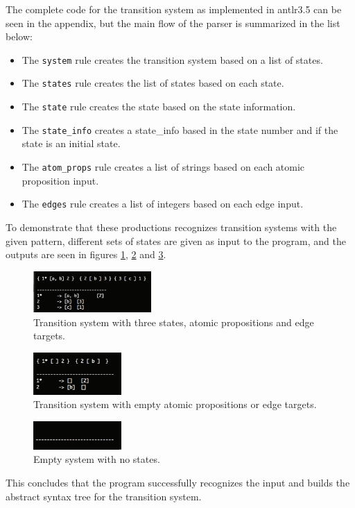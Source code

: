 The complete code for the transition system as implemented in antlr3.5 can be seen in the appendix, but the main flow of the parser is summarized in the list below:

\begin{itemize}
    \item The \texttt{system} rule creates the transition system based on a list of states.
    \item The \texttt{states} rule creates the list of states based on each state. 
    \item The \texttt{state} rule creates the state based on the state information. 
    \item The \texttt{state\_info} creates a state\_info based in the state number and if the state is an initial state. 
    \item The \texttt{atom\_props} rule creates a list of strings based on each atomic proposition input.
    \item The \texttt{edges} rule creates a list of integers based on each edge input.
\end{itemize}

To demonstrate that these productions recognizes transition systems with the given pattern, different sets of states are given as input to the program, and the outputs are seen in figures \ref{fig:Q5ex1}, \ref{fig:Q5ex2} and \ref{fig:Q5ex3}.
\begin{figure}[H]
    \centering
    \includegraphics[width=0.4\textwidth]{fig/Q5example1}
    \caption{Transition system with three states, atomic propositions and edge targets.}
    \label{fig:Q5ex1}
\end{figure}
\begin{figure}[H]
    \centering
    \includegraphics[width=0.3\textwidth]{fig/Q5example2}
    \caption{Transition system with empty atomic propositions or edge targets.}
    \label{fig:Q5ex2}
\end{figure}
\begin{figure}[H]
    \centering
    \includegraphics[width=0.3\textwidth]{fig/Q5example3}
    \caption{Empty system with no states.}
    \label{fig:Q5ex3}
\end{figure}
This concludes that the program successfully recognizes the input and builds the abstract syntax tree for the transition system.